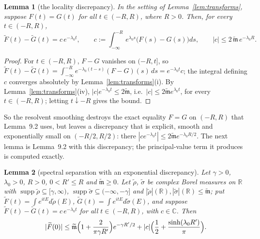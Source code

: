 \documentclass[11pt,a4paper]{article}
\newcommand{\R}{\mathbb{R}}
\newcommand{\C}{\mathbb{C}}
\DeclareMathOperator{\supp}{supp}
\newcommand{\Ft}{\widetilde F}
\newcommand{\Gt}{\widetilde G}
\newcommand{\mt}{\widetilde{\mathfrak m}}
\theoremstyle{plain}
\newtheorem{tlemma}{Lemma}
\theoremstyle{definition}
\begin{document}
\begin{tlemma}[the locality discrepancy]\label{lem:discrepancy}
In the setting of Lemma~\ref{lem:transforms}, suppose $F(t)=G(t)$ for all $t\in(-R,R)$, where
$R>0$.  Then, for every $t\in(-R,R)$,
\[
 \Ft(t)-\Gt(t)=c\,e^{-\lambda_0t},\qquad c:=\int_{-\infty}^{-R}e^{\lambda_0s}\bigl(F(s)-G(s)\bigr)ds,
 \qquad |c|\le2\,\mt\,e^{-\lambda_0R} .
\]
\end{tlemma}

\begin{proof}
For $t\in(-R,R)$, $F-G$ vanishes on $(-R,t]$, so
$\Ft(t)-\Gt(t)=\int_{-\infty}^{-R}e^{-\lambda_0(t-s)}(F-G)(s)\,ds=e^{-\lambda_0t}c$; the integral
defining $c$ converges absolutely by Lemma~\ref{lem:transforms}(i).  By
Lemma~\ref{lem:transforms}(iv), $|c|e^{-\lambda_0t}\le2\mt$, i.e.\ $|c|\le2\mt e^{\lambda_0t}$,
for every $t\in(-R,R)$; letting $t\downarrow-R$ gives the bound.
\end{proof}

So the resolvent smoothing destroys the exact equality $F=G$ on $(-R,R)$ that Lemma~9.2 uses,
but leaves a discrepancy that is explicit, smooth and exponentially small on $(-R/2,R/2)$:
there $|ce^{-\lambda_0t}|\le2\mt e^{-\lambda_0R/2}$.  The next lemma is Lemma~9.2 with this
discrepancy; the principal-value term it produces is computed exactly.

\begin{tlemma}[spectral separation with an exponential discrepancy]\label{lem:sep}
Let $\gamma>0$, $\lambda_0>0$, $R>0$, $0<R'\le R$ and $\mt\ge0$.  Let $\tilde\rho$, $\tilde\sigma$
be complex Borel measures on $\R$ with $\supp\tilde\rho\subseteq[\gamma,\infty)$,
$\supp\tilde\sigma\subseteq(-\infty,-\gamma]$ and $|\tilde\rho|(\R),|\tilde\sigma|(\R)\le\mt$;
put $\Ft(t)=\int e^{itE}d\tilde\rho(E)$, $\Gt(t)=\int e^{itE}d\tilde\sigma(E)$, and suppose
$\Ft(t)-\Gt(t)=c\,e^{-\lambda_0t}$ for all $t\in(-R,R)$, with $c\in\C$.  Then
\begin{equation}
 |\Ft(0)|\le\mt\Bigl(1+\frac{2}{\pi\gamma R'}\Bigr)e^{-\gamma R'/2}
 +|c|\Bigl(\frac12+\frac{\sinh(\lambda_0R')}{\pi}\Bigr).
 \label{eq:sep}
\end{equation}
\end{tlemma}
\end{document}
